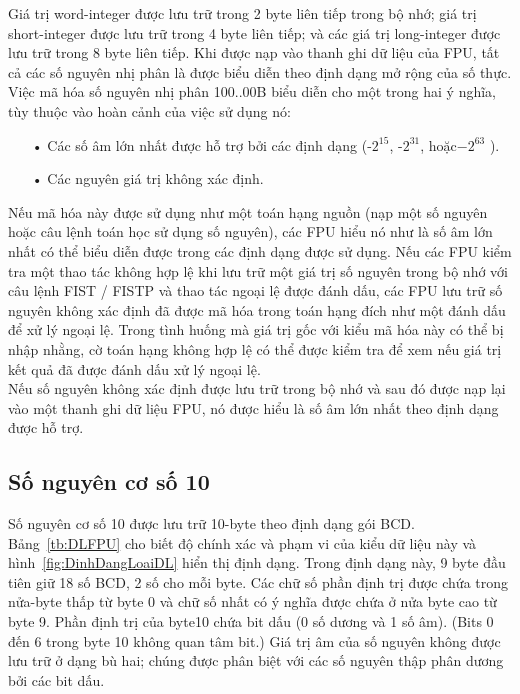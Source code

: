 	Giá trị word-integer được lưu trữ trong 2 byte liên tiếp trong bộ nhớ; giá trị short-integer được lưu trữ trong 4 byte liên tiếp; và các giá trị long-integer được lưu trữ trong 8 byte liên tiếp. Khi được nạp vào thanh ghi dữ liệu của FPU, tất cả các số nguyên nhị phân là được biểu diễn theo định dạng mở rộng của số thực.\\
	
	Việc mã hóa số nguyên nhị phân 100..00B biểu diễn cho một trong hai ý nghĩa, tùy thuộc vào hoàn cảnh của việc sử dụng nó: 
	\begin{itemize}
		\item[•] Các số âm lớn nhất được hỗ trợ bởi các định dạng (-$2^{15}$, -$2^{31}$, hoặc$ -2^{63}$ ).
		 \item[•] Các nguyên giá trị không xác định.
	\end{itemize}

			Nếu mã hóa này được sử dụng như một toán hạng nguồn (nạp một số nguyên hoặc câu lệnh toán học sử dụng số nguyên), các FPU hiểu nó như là số âm lớn nhất có thể biểu diễn được trong các định dạng được sử dụng. Nếu các FPU kiểm tra một thao tác không hợp lệ khi lưu trữ một giá trị số nguyên trong bộ nhớ với câu lệnh FIST / FISTP và thao tác ngoại lệ được đánh dấu, các FPU lưu trữ số nguyên không xác định đã được mã hóa trong toán hạng đích như một đánh dấu để xử lý ngoại lệ. Trong tình huống mà giá trị gốc với kiểu mã hóa này có thể bị nhập nhằng, cờ toán hạng không hợp lệ có thể được kiểm tra để xem nếu giá trị kết quả đã được đánh dấu xử lý ngoại lệ. \\
	
		Nếu số nguyên không xác định được lưu trữ trong bộ nhớ và sau đó được nạp lại vào một thanh ghi dữ liệu FPU, nó được hiểu là số âm lớn nhất theo định dạng được hỗ trợ.
		
		\newpage
		\subsection*{Số nguyên cơ số 10}
		Số nguyên cơ số 10 được lưu trữ 10-byte theo định dạng gói BCD. Bảng~\ref{tb:DLFPU} cho biết độ chính xác và phạm vi của kiểu dữ liệu này và hình~\ref{fig:DinhDangLoaiDL} hiển thị định dạng. Trong định dạng này, 9 byte đầu tiên giữ 18 số BCD, 2 số cho mỗi byte. Các chữ số phần định trị được chứa trong nửa-byte thấp từ byte 0 và chữ số nhất có ý nghĩa được chứa ở nửa byte cao từ byte 9. Phần định trị của byte10 chứa bit dấu (0 số dương và 1 số âm). (Bits 0 đến 6 trong byte 10 không quan tâm bit.) Giá trị âm của số nguyên không được lưu trữ ở dạng bù hai; chúng được phân biệt với các số nguyên thập phân dương bởi các bit dấu.\\
		
